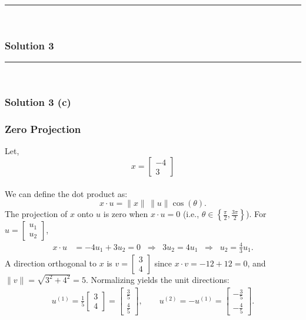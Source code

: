 \documentclass{article}
\begin{document}
\noindent\rule{\textwidth}{0.4pt}\\

\newpage

\subsubsection*{Solution 3}
\noindent\rule{\textwidth}{0.4pt}\\
\subsubsection*{Solution 3 (c)}
\subsubsection*{Zero Projection}
Let, \\
$$x = \begin{bmatrix}-4 \\ 3\end{bmatrix}$$ \\
We can define the dot product as:
$$x \cdot u = \|x\|\,\|u\|\cos(\theta).$$
The projection of $x$ onto $u$ is zero when $x \cdot u = 0$ (i.e., $\theta \in\left\{\frac{\pi}{2}, \frac{3\pi}{2}\right\}$). For $u=\begin{bmatrix}u_1 \\ u_2\end{bmatrix}$,
\begin{align*}
    x \cdot u &= -4u_1 + 3u_2 = 0 \;\;\Longrightarrow\;\; 3u_2 = 4u_1 \;\;\Longrightarrow\;\; u_2 = \frac{4}{3}u_1.
\end{align*}
A direction orthogonal to $x$ is $v=\begin{bmatrix}3 \\ 4\end{bmatrix}$ since $x \cdot v = -12 + 12 = 0$, and $\|v\|=\sqrt{3^2+4^2}=5$. Normalizing yields the unit directions:
\begin{align*}
    u^{(1)} = \frac{1}{5}\begin{bmatrix}3 \\ 4\end{bmatrix} = \begin{bmatrix}\frac{3}{5} \\[2pt] \frac{4}{5}\end{bmatrix},
    \qquad
    u^{(2)} = -u^{(1)} = \begin{bmatrix}-\frac{3}{5} \\[2pt] -\frac{4}{5}\end{bmatrix}.
\end{align*}
\end{document}
